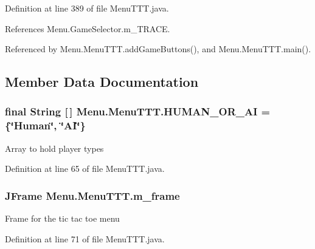 Definition at line 389 of file Menu\+T\+T\+T.\+java.



References Menu.\+Game\+Selector.\+m\+\_\+\+T\+R\+A\+C\+E.



Referenced by Menu.\+Menu\+T\+T\+T.\+add\+Game\+Buttons(), and Menu.\+Menu\+T\+T\+T.\+main().



\subsection{Member Data Documentation}
\hypertarget{class_menu_1_1_menu_t_t_t_ae21a60dde8c0681fe99ca3a163713775}{}
\subsubsection[{H\+U\+M\+A\+N\+\_\+\+O\+R\+\_\+\+A\+I}]{\setlength{\rightskip}{0pt plus 5cm}final String \mbox{[}$\,$\mbox{]} Menu.\+Menu\+T\+T\+T.\+H\+U\+M\+A\+N\+\_\+\+O\+R\+\_\+\+A\+I = \{\char`\"{}Human\char`\"{}, \char`\"{}A\+I\char`\"{}\}\hspace{0.3cm}{\ttfamily [private]}}\label{class_menu_1_1_menu_t_t_t_ae21a60dde8c0681fe99ca3a163713775}
Array to hold player types 

Definition at line 65 of file Menu\+T\+T\+T.\+java.

\hypertarget{class_menu_1_1_menu_t_t_t_a22f4227f781ebf5a22bb0c68c588537d}{}
\subsubsection[{m\+\_\+frame}]{\setlength{\rightskip}{0pt plus 5cm}J\+Frame Menu.\+Menu\+T\+T\+T.\+m\+\_\+frame\hspace{0.3cm}{\ttfamily [private]}}\label{class_menu_1_1_menu_t_t_t_a22f4227f781ebf5a22bb0c68c588537d}
Frame for the tic tac toe menu 

Definition at line 71 of file Menu\+T\+T\+T.\+java.

\hypertarget{class_menu_1_1_menu_t_t_t_a59b7acc44f8e856bd54c46a8c81b1990}{}
